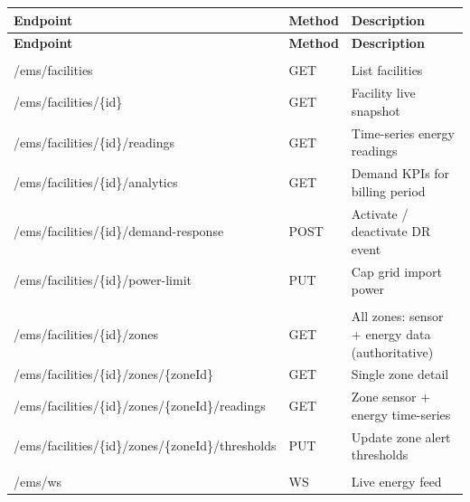 \documentclass{article}
\begin{document}
\begin{longtable}{>{\ttfamily\footnotesize}p{} p{} p{}}
\toprule
\textbf{Endpoint} & \textbf{Method} & \textbf{Description}\\
\midrule
\endfirsthead
\toprule
\textbf{Endpoint} & \textbf{Method} & \textbf{Description}\\
\midrule
\endhead
\bottomrule
\endfoot

\multicolumn{3}{l}{\textit{Facilities}}\\[2pt]
/ems/facilities                     & GET    & List facilities\\
/ems/facilities/\{id\}              & GET    & Facility live snapshot\\
/ems/facilities/\{id\}/readings     & GET    & Time-series energy readings\\
/ems/facilities/\{id\}/analytics    & GET    & Demand KPIs for billing period\\
/ems/facilities/\{id\}/demand-response     & POST & Activate / deactivate DR event\\
/ems/facilities/\{id\}/power-limit         & PUT  & Cap grid import power\\[4pt]

\multicolumn{3}{l}{\textit{Zones}}\\[2pt]
/ems/facilities/\{id\}/zones               & GET  & All zones: sensor + energy data (authoritative)\\
/ems/facilities/\{id\}/zones/\{zoneId\}   & GET  & Single zone detail\\
/ems/facilities/\{id\}/zones/\{zoneId\}/readings & GET & Zone sensor + energy time-series\\
/ems/facilities/\{id\}/zones/\{zoneId\}/thresholds & PUT & Update zone alert thresholds\\[4pt]

\multicolumn{3}{l}{\textit{WebSocket}}\\[2pt]
/ems/ws                                    & WS   & Live energy feed\\
\end{longtable}
\end{document}
